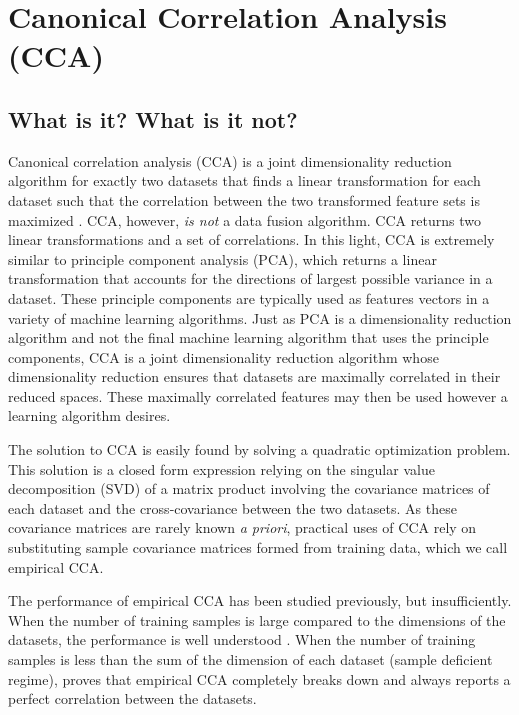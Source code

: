 \section{Canonical Correlation Analysis (CCA)}

\subsection{What is it? What is it not?}

Canonical correlation analysis (CCA) is a joint dimensionality reduction algorithm for
exactly two datasets that finds a linear transformation for each dataset such that the
correlation between the two transformed feature sets is maximized
\cite{hotelling1936relations}. CCA, however, \textit{is not} a data fusion algorithm. CCA
returns two linear transformations and a set of correlations. In this light, CCA is
extremely similar to principle component analysis (PCA), which returns a linear
transformation that accounts for the directions of largest possible variance in a
dataset. These principle components are typically used as features vectors in a variety of
machine learning algorithms. Just as PCA is a dimensionality reduction algorithm and not
the final machine learning algorithm that uses the principle components, CCA is a joint
dimensionality reduction algorithm whose dimensionality reduction ensures that datasets
are maximally correlated in their reduced spaces. These maximally correlated features may
then be used however a learning algorithm desires. 

The solution to CCA is easily found by solving a quadratic optimization problem. This
solution is a closed form expression relying on the singular value decomposition (SVD) of
a matrix product involving the covariance matrices of each dataset and the
cross-covariance between the two datasets. As these covariance matrices are rarely known
\textit{a priori}, practical uses of CCA rely on substituting sample covariance matrices
formed from training data, which we call empirical CCA.

The performance of empirical CCA has been studied previously, but insufficiently. When the
number of training samples is large compared to the dimensions of the datasets, the
performance is well understood \cite{gunderson1997estimating}. When the number of training
samples is less than the sum of the dimension of each dataset (sample deficient regime),
\cite{pezeshki2004empirical} proves that empirical CCA completely breaks down and always
reports a perfect correlation between the datasets. 

